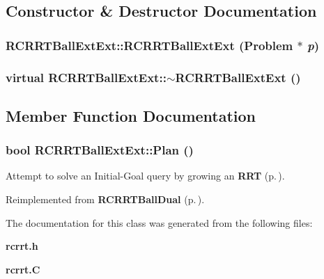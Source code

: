 \subsection{Constructor \& Destructor Documentation}
\subsubsection{\setlength{\rightskip}{0pt plus 5cm}RCRRTBall\-Ext\-Ext::RCRRTBall\-Ext\-Ext ({\bf Problem} $\ast$ {\em p})}\label{classRCRRTBallExtExt_a0}


\subsubsection{\setlength{\rightskip}{0pt plus 5cm}virtual RCRRTBall\-Ext\-Ext::$\sim$RCRRTBall\-Ext\-Ext ()\hspace{0.3cm}{\tt  [inline, virtual]}}\label{classRCRRTBallExtExt_a1}




\subsection{Member Function Documentation}
\subsubsection{\setlength{\rightskip}{0pt plus 5cm}bool RCRRTBall\-Ext\-Ext::Plan ()\hspace{0.3cm}{\tt  [virtual]}}\label{classRCRRTBallExtExt_a2}


Attempt to solve an Initial-Goal query by growing an {\bf RRT} {\rm (p.\,\pageref{classRRT})}.



Reimplemented from {\bf RCRRTBall\-Dual} {\rm (p.\,\pageref{classRCRRTBallDual_a2})}.

The documentation for this class was generated from the following files:\begin{CompactItemize}
\item 
{\bf rcrrt.h}\item 
{\bf rcrrt.C}\end{CompactItemize}
